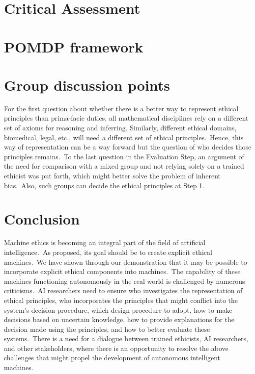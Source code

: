 \documentclass[10pt, a4paper, twocolumn]{article}
\begin{document}
\section{Critical Assessment}


\section{POMDP framework}



\section{Group discussion points}
For the first question about whether there is a better way to represent ethical principles than prima-facie duties, all mathematical disciplines rely on a different set of axioms for reasoning and inferring. Similarly, different ethical domains, biomedical, legal, etc., will need a different set of ethical principles.\ Hence, this way of representation can be a way forward but the question of who decides those principles remains.\ To the last question in the Evaluation Step, an argument of the need for comparison with a mixed group and not relying solely on a trained ethicist was put forth, which might better solve the problem of inherent bias.\ Also, such groups can decide the ethical principles at Step 1.

\section{Conclusion}
Machine ethics is becoming an integral part of the field of artificial intelligence.\ As proposed, its goal should be to create explicit ethical machines.\ We have shown through our demonstration that it may be possible to incorporate explicit ethical components into machines.\ The capability of these machines functioning autonomously in the real world is challenged by numerous criticisms.\ AI researchers need to ensure who investigates the representation of ethical principles, who incorporates the principles that might conflict into the system's decision procedure, which design procedure to adopt, how to make decisions based on uncertain knowledge, how to provide explanations for the decision made using the principles, and how to better evaluate these systems.\ There is a need for a dialogue between trained ethicists, AI researchers, and other stakeholders, where there is an opportunity to resolve the above challenges that might propel the development of autonomous intelligent machines.

\printbibliography
\end{document}
